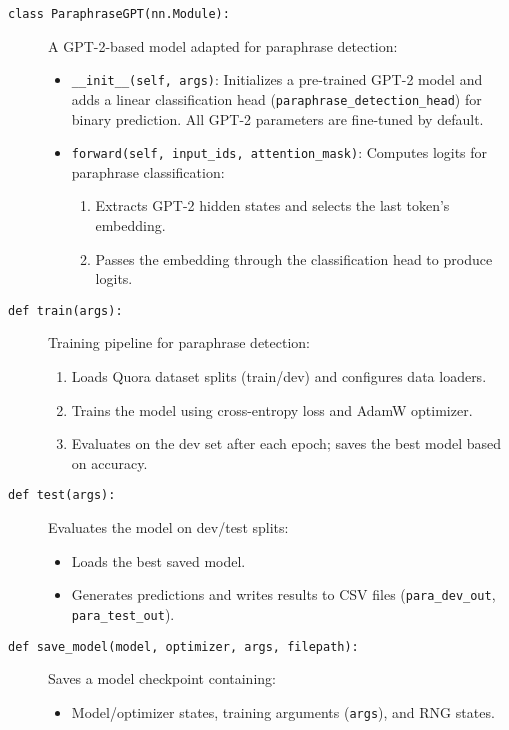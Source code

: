 \begin{description}

  \item[\texttt{class ParaphraseGPT(nn.Module):}]  
    A GPT-2-based model adapted for paraphrase detection:  
    \begin{itemize}
      \item \texttt{\_\_init\_\_(self, args)}:  
        Initializes a pre-trained GPT-2 model and adds a linear classification head (\texttt{paraphrase\_detection\_head}) for binary prediction. All GPT-2 parameters are fine-tuned by default.
      \item \texttt{forward(self, input\_ids, attention\_mask)}:  
        Computes logits for paraphrase classification:  
        \begin{enumerate}
          \item Extracts GPT-2 hidden states and selects the last token's embedding.
          \item Passes the embedding through the classification head to produce logits.
        \end{enumerate}
    \end{itemize}

  \item[\texttt{def train(args):}]  
    Training pipeline for paraphrase detection:  
    \begin{enumerate}
      \item Loads Quora dataset splits (train/dev) and configures data loaders.
      \item Trains the model using cross-entropy loss and AdamW optimizer.
      \item Evaluates on the dev set after each epoch; saves the best model based on accuracy.
    \end{enumerate}

  \item[\texttt{def test(args):}]  
    Evaluates the model on dev/test splits:  
    \begin{itemize}
      \item Loads the best saved model.
      \item Generates predictions and writes results to CSV files (\texttt{para\_dev\_out}, \texttt{para\_test\_out}).
    \end{itemize}

  \item[\texttt{def save\_model(model, optimizer, args, filepath):}]  
    Saves a model checkpoint containing:  
    \begin{itemize}
      \item Model/optimizer states, training arguments (\texttt{args}), and RNG states.
    \end{itemize}


\end{description}
